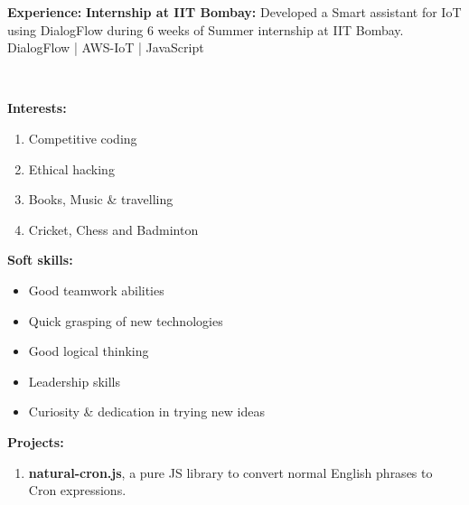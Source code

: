 \documentclass[a4paper,11pt]{article}
\begin{document}
\begin{center}
\begin{minipage}[t]{0.35\textwidth}
            \begin{LARGE}
				\textbf{Experience:}\medskip%
				{\small
					\vspace{0.2cm}
					\newline
					\textbf{Internship at IIT Bombay:}
					\newline
					Developed a Smart assistant for IoT using DialogFlow during 6 weeks of Summer internship at IIT Bombay.
					\medskip
					\\DialogFlow | AWS-IoT | JavaScript
				}
			\end{LARGE}
			\\\vspace{0.7cm}
            \begin{LARGE}
				\textbf{Interests:}\smallskip%
				{\small
					\begin{enumerate}[leftmargin=*,label=-]
						\item Competitive coding
						\item Ethical hacking
						\item Books, Music \& travelling
						\item Cricket, Chess and Badminton
					\end{enumerate}
				}
			\end{LARGE}
			\vspace{0.55cm}
			\begin{LARGE}
				\textbf{Soft skills:}\smallskip%
				{\small
					\begin{itemize}[leftmargin=*]
						\item Good teamwork abilities
						\item Quick grasping of new technologies
						\item Good logical thinking
						\item Leadership skills
						\item Curiosity \& dedication in trying new ideas
					\end{itemize}
				}
			\end{LARGE}
		\end{minipage}%
		\hspace{0.6cm}
		\begin{minipage}[t]{0.6\textwidth}
			\raggedright\smallskip
			\begin{LARGE}
				\textbf{Projects:}\medskip%
				{\small
					\begin{enumerate}
						\item \textbf{natural-cron.js}, a pure JS library to convert normal English phrases to Cron expressions.\linebreak

\end{enumerate}}
\end{LARGE}
\end{minipage}
\end{center}
\end{document}
